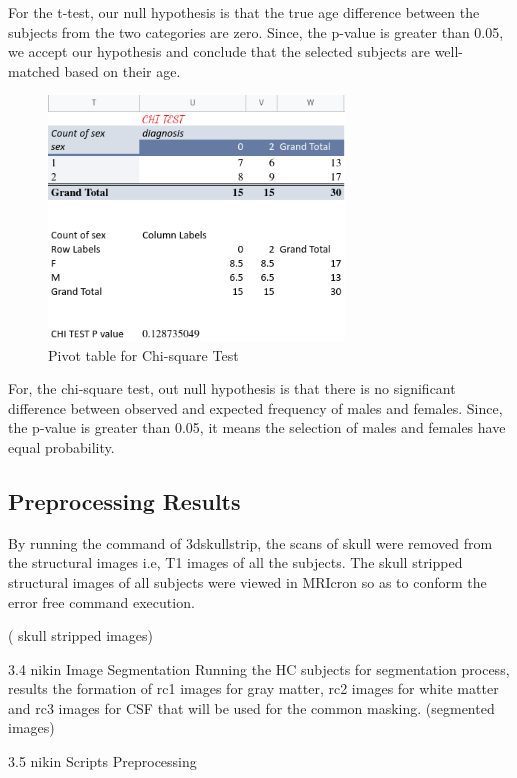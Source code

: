\documentclass[12pt]{article}
\begin{document}
For the t-test, our null hypothesis is that the true age
difference between the subjects from the two categories are zero.
Since, the p-value is greater than 0.05, we accept our hypothesis and
conclude that the selected subjects are well-matched based on their
age.

\enlargethispage{\baselineskip}
\begin{figure}[H]
  \centering
  \includegraphics[width=0.7\textwidth]{./.img/chi-test-excel.png}
  \caption{Pivot table for Chi-square Test}%
  \label{fig:}
\end{figure}
For, the chi-square test, out null hypothesis is that there is no
significant difference between observed and expected frequency of
males and females. Since, the p-value is greater than 0.05, it means
the selection of males and females have equal probability.

\subsection{Preprocessing Results}%
\label{sub:preprocessing_results}



By running the command of 3dskullstrip, the
scans of skull were removed from the structural images i.e, T1 images
of all the subjects. The skull stripped structural images of all
subjects were viewed in MRIcron so as to conform the error free
command execution.


( skull stripped images)

3.4 nikin Image Segmentation Running the HC subjects for segmentation
process, results the formation of rc1 images for gray matter, rc2
images for white matter and rc3 images for CSF that will be used for
the common masking. (segmented images)

3.5 nikin Scripts Preprocessing
\end{document}
